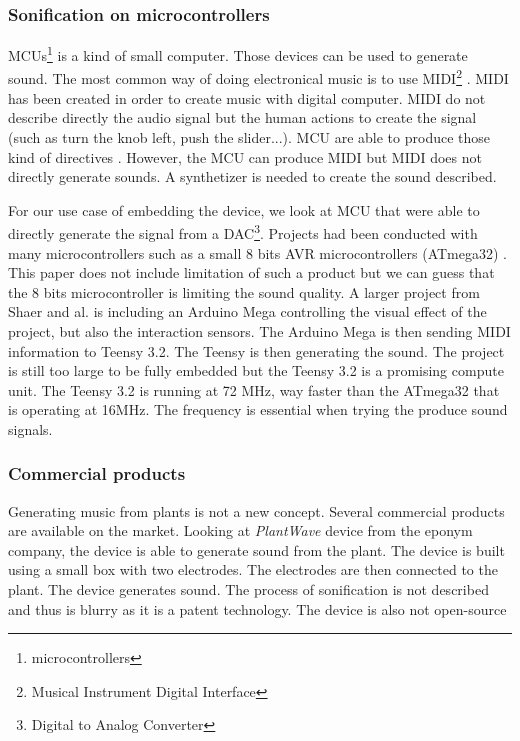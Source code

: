 \subsubsection{Sonification on microcontrollers}

MCUs\footnote{microcontrollers} \cite{rochim2019design} is a kind of small computer.
Those devices can be used to generate sound. The most common way of doing electronical music
is to use MIDI\footnote{Musical Instrument Digital Interface} \cite{loyMusiciansMakeStandard1985}.
MIDI has been created in order to create music with digital computer. MIDI do not describe directly
the audio signal but the human actions to create the signal (such as turn the knob left, push the slider...).
MCU are able to produce those kind of directives \cite{fazendaProceedingsInternationalConference1}\cite{fazendaProceedingsInternationalConference2}.
However, the MCU can produce MIDI but MIDI does not directly generate sounds. A synthetizer is needed to create the sound
described.

For our use case of embedding the device, we look at MCU that were able to directly generate the signal
from a DAC\footnote{Digital to Analog Converter}. Projects had been conducted with many microcontrollers such as a small
8 bits AVR microcontrollers (ATmega32) \cite{hussainAVRMicrocontrollerImplementation2011}. This paper does not include limitation of
such a product but we can guess that the 8 bits microcontroller is limiting the sound quality. A larger project from Shaer and al.
\cite{shaerInteractiveCapacitiveTouch2020} is including an Arduino Mega controlling the visual effect of the project,
but also the interaction sensors. The Arduino Mega is then sending MIDI information to Teensy 3.2. The Teensy is then
generating the sound. The project is still too large to be fully embedded but the Teensy 3.2 is a promising compute unit.
The Teensy 3.2 is running at 72 MHz, way faster than the ATmega32 that is operating at 16MHz. The frequency is essential
when trying the produce sound signals.


\subsubsection{Commercial products}

Generating music from plants is not a new concept. Several commercial products are available on the market.
Looking at \textit{PlantWave} device from the eponym company, the device is able to generate sound from the plant. The device is
built using a small box with two electrodes. The electrodes are then connected to the plant. The device generates sound.
The process of sonification is not described and thus is blurry as it is a patent technology. The device is also not open-source

